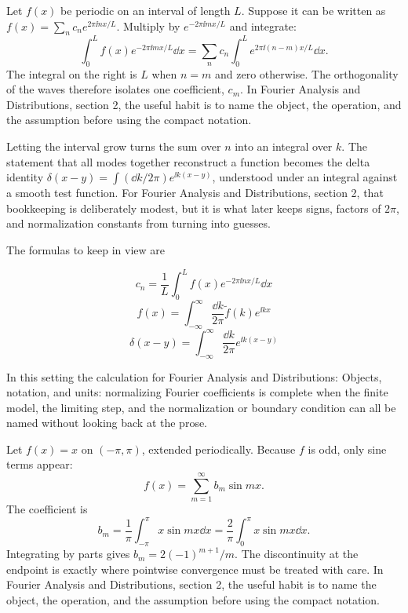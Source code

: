 Let \(f(x)\) be periodic on an interval of length \(L\).  Suppose it can be written as \(f(x)=\sum_n c_ne^{2\pi\ii nx/L}\).  Multiply by \(e^{-2\pi\ii mx/L}\) and integrate:
\[
  \int_0^L f(x)e^{-2\pi\ii mx/L}\dd x
  =
  \sum_n c_n\int_0^L e^{2\pi\ii(n-m)x/L}\dd x.
\]
The integral on the right is \(L\) when \(n=m\) and zero otherwise.  The orthogonality of the waves therefore isolates one coefficient, \(c_m\).  In Fourier Analysis and Distributions, section 2, the useful habit is to name the object, the operation, and the assumption before using the compact notation.

Letting the interval grow turns the sum over \(n\) into an integral over \(k\).  The statement that all modes together reconstruct a function becomes the delta identity \(\delta(x-y)=\int(\dd k/2\pi)e^{\ii k(x-y)}\), understood under an integral against a smooth test function.  For Fourier Analysis and Distributions, section 2, that bookkeeping is deliberately modest, but it is what later keeps signs, factors of \(2\pi\), and normalization constants from turning into guesses.

The formulas to keep in view are

\[
  c_n=\frac1L\int_0^L f(x)e^{-2\pi\ii nx/L}\dd x
\]
\[
  f(x)=\int_{-\infty}^{\infty}\frac{\dd k}{2\pi}\tilde f(k)e^{\ii kx}
\]
\[
  \delta(x-y)=\int_{-\infty}^{\infty}\frac{\dd k}{2\pi}e^{\ii k(x-y)}
\]

In this setting the calculation for Fourier Analysis and Distributions: Objects, notation, and units: normalizing Fourier coefficients is complete when the finite model, the limiting step, and the normalization or boundary condition can all be named without looking back at the prose.




\begin{example}
Let \(f(x)=x\) on \((-\pi,\pi)\), extended periodically.  Because \(f\) is odd, only sine terms appear:
\[
  f(x)=\sum_{m=1}^\infty b_m\sin mx.
\]
The coefficient is
\[
  b_m=\frac1\pi\int_{-\pi}^\pi x\sin mx\dd x
  =\frac2\pi\int_0^\pi x\sin mx\dd x.
\]
Integrating by parts gives \(b_m=2(-1)^{m+1}/m\).  The discontinuity at the endpoint is exactly where pointwise convergence must be treated with care.  In Fourier Analysis and Distributions, section 2, the useful habit is to name the object, the operation, and the assumption before using the compact notation.
\end{example}




